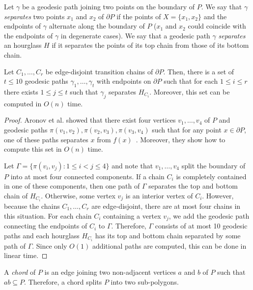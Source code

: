 \documentclass[a4paper,UKenglish]{lipics}
\newcommand{\ff}[1]{\ensuremath{f(#1)}}
\newcommand{\p}[2]{\ensuremath{\pi(#1, #2)}}
\begin{document}
Let $\gamma$ be a  geodesic path joining two points on the boundary of $P$.
We say that $\gamma$ \emph{separates} two points $x_1$ and $x_2$ of $\partial P$ if the points of $X=\{x_1, x_2\}$ and the endpoints of $\gamma$ alternate along the boundary of $P$ ($x_1$ and $x_2$ could coincide with the endpoints of $\gamma$ in degenerate cases). We say that a geodesic path $\gamma$ \emph{separates} an hourglass $H$ if it separates the points of its top chain from those of its  bottom chain.

\begin{lemma}\label{lemma:Split paths}
Let $C_1, \ldots, C_r$ be edge-disjoint transition chains of $\partial P$. Then, there is a set of $t \leq 10$ geodesic paths $\gamma_1, \ldots, \gamma_t$ with endpoints on $\partial P$ such that for each $1\leq i\leq r$ there exists $1\leq j\leq t$ such that $\gamma_j$ separates $H_{C_i}$.
Moreover, this set can be computed in $O(n)$ time.
\end{lemma}
\begin{proof}
Aronov et al. showed that there exist four vertices $v_1, \ldots, v_4$ of $P$ and geodesic paths $\p{v_1}{v_2}, \p{v_2}{v_3}, \p{v_3}{v_4}$ such that for any point $x\in \partial P$, one of these paths separates $x$ from $\ff{x}$~\cite[Lemma 2.7.6]{aronov1993furthest}. Moreover, they show how to compute this set in $O(n)$ time.

Let $\Gamma= \{\p{v_i}{v_j} : 1\leq i < j\leq 4\}$ and note that $v_1, \ldots, v_4$ split the boundary of $P$ into at most four connected components.
If a chain $C_i$ is completely contained in one of these components, then one path of $\Gamma$ separates the top and bottom chain of $H_{C_i}$. Otherwise, some vertex $v_j$ is an interior vertex of $C_i$. However, because the chains $C_1, \ldots, C_r$ are edge-disjoint, there are at most four chains in this situation. 
For each chain $C_i$ containing a vertex $v_j$, we add the geodesic path connecting the endpoints of $C_i$ to $\Gamma$.
Therefore, $\Gamma$ consists of at most 10 geodesic paths and each hourglass $H_{C_i}$ has its top and bottom chain separated by some path of $\Gamma$.
Since only $O(1)$ additional paths are computed, this can be done in linear time.
\end{proof}

A \emph{chord} of $P$ is an edge joining two non-adjacent vertices $a$ and $b$ of $P$ such that $ab\subseteq P$. Therefore, a chord splits $P$ into two sub-polygons.
\end{document}
